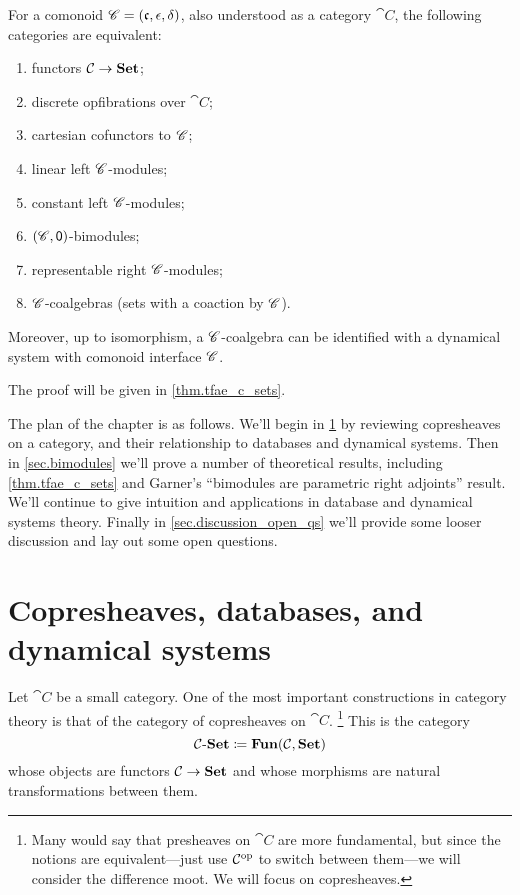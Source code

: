 \documentclass[DynamicalBook]{subfiles}
\begin{document}
\begin{theorem}\label{thm.tfae_c_sets}
For a comonoid $\mathscr{C}=(\mathfrak{c},\epsilon,\delta)$, also understood as a category $\cat{C}$, the following categories are equivalent:
\begin{enumerate}
	\item functors $\mathcal{C}\to\textbf{Set}$;
	\item discrete opfibrations over $\cat{C}$;
	\item cartesian cofunctors to $\mathscr{C}$;
	\item linear left $\mathscr{C}$-modules;
	\item constant left $\mathscr{C}$-modules;
	\item $(\mathscr{C},\textsf{0})$-bimodules;
	\item representable right $\mathscr{C}$-modules;
	\item $\mathscr{C}$-coalgebras (sets with a coaction by $\mathscr{C}$).
\end{enumerate}
Moreover, up to isomorphism, a $\mathscr{C}$-coalgebra can be identified with a dynamical system with comonoid interface $\mathscr{C}$.
\end{theorem}
The proof will be given in \cref{thm.tfae_c_sets}.

The plan of the chapter is as follows. We'll begin in \cref{sec.copresheaves_data_ds} by reviewing copresheaves on a category, and their relationship to databases and dynamical systems. Then in \cref{sec.bimodules} we'll prove a number of theoretical results, including \cref{thm.tfae_c_sets} and Garner's ``bimodules are parametric right adjoints'' result. We'll continue to give intuition and applications in database and dynamical systems theory. Finally in \cref{sec.discussion_open_qs} we'll provide some looser discussion and lay out some open questions.

\section{Copresheaves, databases, and dynamical systems}\label{sec.copresheaves_data_ds}

Let $\cat{C}$ be a small category. One of the most important constructions in category theory is that of the category of copresheaves on $\cat{C}$.%
\footnote{Many would say that presheaves on $\cat{C}$ are more fundamental, but since the notions are equivalent---just use $\mathcal{C}^{\textnormal{op}}$ to switch between them---we will consider the difference moot. We will focus on copresheaves.}
This is the category
\[
\mathcal{C}\textnormal{-}\textbf{Set}\coloneqq\textbf{Fun}(\mathcal{C},\textbf{Set})
\]
whose objects are functors $\mathcal{C}\to\textbf{Set}$ and whose morphisms are natural transformations between them.
\end{document}
